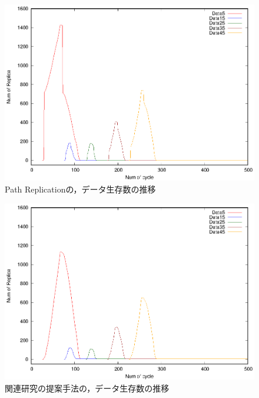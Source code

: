 \documentclass[11pt]{jreport}
\begin{document}
\begin{figure}[H]
	\begin{center}
		\includegraphics[width=15.0cm]{./figure/path_counter.eps}
	\end{center}
	\caption{Path Replicationの，データ生存数の推移}
	\label{fig:path_c}
\end{figure}

\begin{figure}[H]
	\begin{center}
		\includegraphics[width=15.0cm]{./figure/relate_counter.eps}
	\end{center}
	\caption{関連研究の提案手法の，データ生存数の推移}
	\label{fig:relate_c}
\end{figure}
\end{document}

